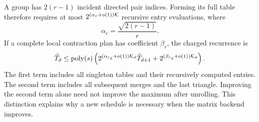 A group has $2(r-1)$ incident directed pair indices. Forming its full
table therefore requires at most
$2^{(\alpha_r+o(1))\mathcal K}$ recursive entry evaluations, where
\begin{equation}\label{eq:alpha}
 \alpha_r=\frac{\sqrt{2(r-1)}}r.
\end{equation}
If a complete local contraction plan has coefficient $\beta_r$, the
charged recurrence is
\begin{equation}\label{eq:paid}
 \widehat T_d\le\operatorname{poly}(s)
   \left(2^{(\alpha_{r_d}+o(1))\mathcal K_d}\widehat T_{d+1}
        +2^{(\beta_{r_d}+o(1))\mathcal K_d}\right).
\end{equation}
The first term includes all singleton tables and their recursively
computed entries. The second term includes all subsequent merges and the
last triangle. Improving the second term alone need not improve the
maximum after unrolling. This distinction explains why a new schedule is
necessary when the matrix backend improves.
